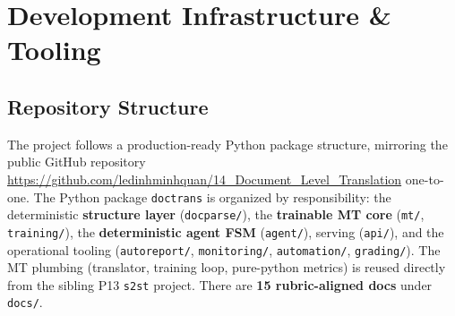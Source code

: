 \documentclass[12pt,a4paper]{article}
\begin{document}
\section{Development Infrastructure \& Tooling}

\subsection{Repository Structure}

The project follows a production-ready Python package structure, mirroring the public GitHub repository \url{https://github.com/ledinhminhquan/14_Document_Level_Translation} one-to-one. The Python package \texttt{doctrans} is organized by responsibility: the deterministic \textbf{structure layer} (\texttt{docparse/}), the \textbf{trainable MT core} (\texttt{mt/}, \texttt{training/}), the \textbf{deterministic agent FSM} (\texttt{agent/}), serving (\texttt{api/}), and the operational tooling (\texttt{autoreport/}, \texttt{monitoring/}, \texttt{automation/}, \texttt{grading/}). The MT plumbing (translator, training loop, pure-python metrics) is reused directly from the sibling P13 \texttt{s2st} project. There are \textbf{15 rubric-aligned docs} under \texttt{docs/}.
\end{document}
